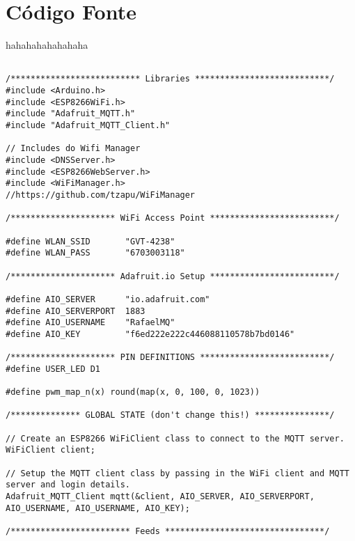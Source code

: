 \chapter{Código Fonte}


hahahahahahahaha

\begin{lstlisting}

/************************** Libraries ***************************/
#include <Arduino.h>
#include <ESP8266WiFi.h>
#include "Adafruit_MQTT.h"
#include "Adafruit_MQTT_Client.h"

// Includes do Wifi Manager
#include <DNSServer.h>
#include <ESP8266WebServer.h>
#include <WiFiManager.h>         //https://github.com/tzapu/WiFiManager

/********************* WiFi Access Point *************************/

#define WLAN_SSID       "GVT-4238"
#define WLAN_PASS       "6703003118"

/********************* Adafruit.io Setup *************************/

#define AIO_SERVER      "io.adafruit.com"
#define AIO_SERVERPORT  1883
#define AIO_USERNAME    "RafaelMQ"
#define AIO_KEY         "f6ed222e222c446088110578b7bd0146"

/********************* PIN DEFINITIONS **************************/
#define USER_LED D1

#define pwm_map_n(x) round(map(x, 0, 100, 0, 1023))

/************** GLOBAL STATE (don't change this!) ***************/

// Create an ESP8266 WiFiClient class to connect to the MQTT server.
WiFiClient client;

// Setup the MQTT client class by passing in the WiFi client and MQTT server and login details.
Adafruit_MQTT_Client mqtt(&client, AIO_SERVER, AIO_SERVERPORT, AIO_USERNAME, AIO_USERNAME, AIO_KEY);

/************************ Feeds ********************************/


\end{lstlisting}
